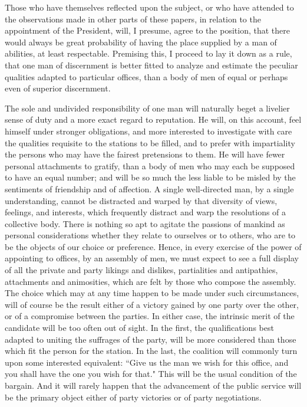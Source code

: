 Those who have themselves reflected upon the subject, or who have attended to the observations made in other parts of these papers, in relation to the appointment of the President, will, I presume, agree to the position, that there would always be great probability of having the place supplied by a man of abilities, at least respectable. 
Premising this, I proceed to lay it down as a rule, that one man of discernment is better fitted to analyze and estimate the peculiar qualities adapted to particular offices, than a body of men of equal or perhaps even of superior discernment.

The sole and undivided responsibility of one man will naturally beget a livelier sense of duty and a more exact regard to reputation. 
He will, on this account, feel himself under stronger obligations, and more interested to investigate with care the qualities requisite to the stations to be filled, and to prefer with impartiality the persons who may have the fairest pretensions to them. 
He will have fewer personal attachments to gratify, than a body of men who may each be supposed to have an equal number; and will be so much the less liable to be misled by the sentiments of friendship and of affection. 
A single well-directed man, by a single understanding, cannot be distracted and warped by that diversity of views, feelings, and interests, which frequently distract and warp the resolutions of a collective body. 
There is nothing so apt to agitate the passions of mankind as personal considerations whether they relate to ourselves or to others, who are to be the objects of our choice or preference. 
Hence, in every exercise of the power of appointing to offices, by an assembly of men, we must expect to see a full display of all the private and party likings and dislikes, partialities and antipathies, attachments and animosities, which are felt by those who compose the assembly. 
The choice which may at any time happen to be made under such circumstances, will of course be the result either of a victory gained by one party over the other, or of a compromise between the parties. 
In either case, the intrinsic merit of the candidate will be too often out of sight. 
In the first, the qualifications best adapted to uniting the suffrages of the party, will be more considered than those which fit the person for the station. 
In the last, the coalition will commonly turn upon some interested equivalent: ``Give us the man we wish for this office, and you shall have the one you wish for that." This will be the usual condition of the bargain. 
And it will rarely happen that the advancement of the public service will be the primary object either of party victories or of party negotiations.

